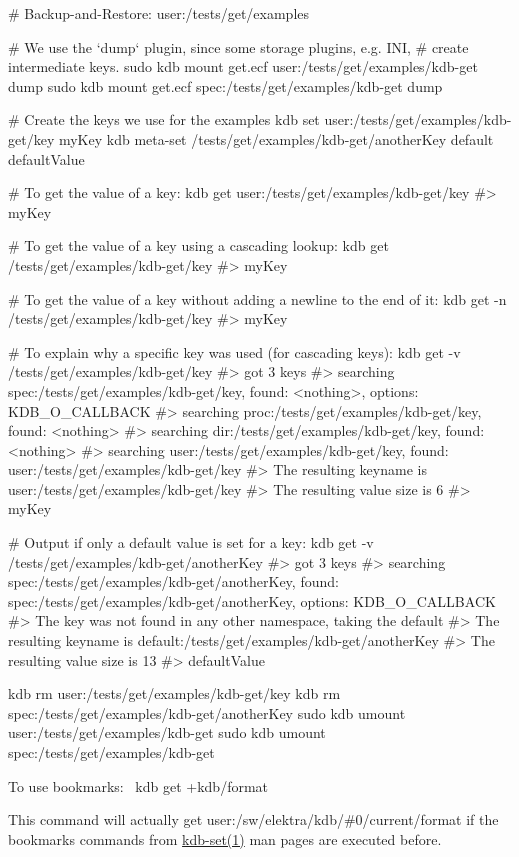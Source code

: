 \begin{DoxyCode}
# Backup-and-Restore: user:/tests/get/examples

# We use the `dump` plugin, since some storage plugins, e.g. INI,
# create intermediate keys.
sudo kdb mount get.ecf user:/tests/get/examples/kdb-get dump
sudo kdb mount get.ecf spec:/tests/get/examples/kdb-get dump

# Create the keys we use for the examples
kdb set user:/tests/get/examples/kdb-get/key myKey
kdb meta-set /tests/get/examples/kdb-get/anotherKey default defaultValue

# To get the value of a key:
kdb get user:/tests/get/examples/kdb-get/key
#> myKey

# To get the value of a key using a cascading lookup:
kdb get /tests/get/examples/kdb-get/key
#> myKey

# To get the value of a key without adding a newline to the end of it:
kdb get -n /tests/get/examples/kdb-get/key
#> myKey

# To explain why a specific key was used (for cascading keys):
kdb get -v /tests/get/examples/kdb-get/key
#> got 3 keys
#> searching spec:/tests/get/examples/kdb-get/key, found: <nothing>, options: KDB\_O\_CALLBACK
#>     searching proc:/tests/get/examples/kdb-get/key, found: <nothing>
#>     searching dir:/tests/get/examples/kdb-get/key, found: <nothing>
#>     searching user:/tests/get/examples/kdb-get/key, found: user:/tests/get/examples/kdb-get/key
#> The resulting keyname is user:/tests/get/examples/kdb-get/key
#> The resulting value size is 6
#> myKey

# Output if only a default value is set for a key:
kdb get -v /tests/get/examples/kdb-get/anotherKey
#> got 3 keys
#> searching spec:/tests/get/examples/kdb-get/anotherKey, found:
       spec:/tests/get/examples/kdb-get/anotherKey, options: KDB\_O\_CALLBACK
#> The key was not found in any other namespace, taking the default
#> The resulting keyname is default:/tests/get/examples/kdb-get/anotherKey
#> The resulting value size is 13
#> defaultValue

kdb rm user:/tests/get/examples/kdb-get/key
kdb rm spec:/tests/get/examples/kdb-get/anotherKey
sudo kdb umount user:/tests/get/examples/kdb-get
sudo kdb umount spec:/tests/get/examples/kdb-get
\end{DoxyCode}


To use bookmarks\+:~\newline
 {\ttfamily kdb get +kdb/format}

This command will actually get {\ttfamily user\+:/sw/elektra/kdb/\#0/current/format} if the bookmarks commands from \hyperlink{doc_help_kdb-set_md}{kdb-\/set(1)} man pages are executed before.


